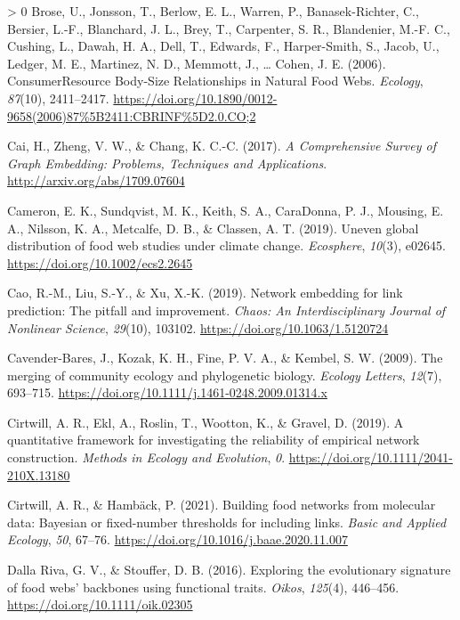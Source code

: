 \documentclass[11pt]{article}
\newlength{\cslhangindent}
\newenvironment{CSLReferences}[3] %
 {%
  \setlength{\parindent}{0pt}
  \ifodd #1 \everypar{\setlength{\hangindent}{\cslhangindent}}\ignorespaces\fi
  \ifnum #2 > 0
  \setlength{\parskip}{#2\baselineskip}
  \fi
 }%
 {}
\begin{document}
\begin{CSLReferences}{1}{0}
\leavevmode\hypertarget{ref-Brose2006ConRes}{}%
Brose, U., Jonsson, T., Berlow, E. L., Warren, P., Banasek-Richter, C.,
Bersier, L.-F., Blanchard, J. L., Brey, T., Carpenter, S. R.,
Blandenier, M.-F. C., Cushing, L., Dawah, H. A., Dell, T., Edwards, F.,
Harper-Smith, S., Jacob, U., Ledger, M. E., Martinez, N. D., Memmott,
J., \ldots{} Cohen, J. E. (2006). ConsumerResource Body-Size
Relationships in Natural Food Webs. \emph{Ecology}, \emph{87}(10),
2411--2417.
\url{https://doi.org/10.1890/0012-9658(2006)87\%5B2411:CBRINF\%5D2.0.CO;2}

\leavevmode\hypertarget{ref-Cai2017ComSur}{}%
Cai, H., Zheng, V. W., \& Chang, K. C.-C. (2017). \emph{A Comprehensive
Survey of Graph Embedding: Problems, Techniques and Applications}.
\url{http://arxiv.org/abs/1709.07604}

\leavevmode\hypertarget{ref-Cameron2019UneGlo}{}%
Cameron, E. K., Sundqvist, M. K., Keith, S. A., CaraDonna, P. J.,
Mousing, E. A., Nilsson, K. A., Metcalfe, D. B., \& Classen, A. T.
(2019). Uneven global distribution of food web studies under climate
change. \emph{Ecosphere}, \emph{10}(3), e02645.
\url{https://doi.org/10.1002/ecs2.2645}

\leavevmode\hypertarget{ref-Cao2019NetEmb}{}%
Cao, R.-M., Liu, S.-Y., \& Xu, X.-K. (2019). Network embedding for link
prediction: The pitfall and improvement. \emph{Chaos: An
Interdisciplinary Journal of Nonlinear Science}, \emph{29}(10), 103102.
\url{https://doi.org/10.1063/1.5120724}

\leavevmode\hypertarget{ref-Cavender-Bares2009MerCom}{}%
Cavender-Bares, J., Kozak, K. H., Fine, P. V. A., \& Kembel, S. W.
(2009). The merging of community ecology and phylogenetic biology.
\emph{Ecology Letters}, \emph{12}(7), 693--715.
\url{https://doi.org/10.1111/j.1461-0248.2009.01314.x}

\leavevmode\hypertarget{ref-Cirtwill2019QuaFra}{}%
Cirtwill, A. R., Ekl, A., Roslin, T., Wootton, K., \& Gravel, D. (2019).
A quantitative framework for investigating the reliability of empirical
network construction. \emph{Methods in Ecology and Evolution}, \emph{0}.
\url{https://doi.org/10.1111/2041-210X.13180}

\leavevmode\hypertarget{ref-Cirtwill2021BuiFoo}{}%
Cirtwill, A. R., \& Hambäck, P. (2021). Building food networks from
molecular data: Bayesian or fixed-number thresholds for including links.
\emph{Basic and Applied Ecology}, \emph{50}, 67--76.
\url{https://doi.org/10.1016/j.baae.2020.11.007}

\leavevmode\hypertarget{ref-DallaRiva2016ExpEvo}{}%
Dalla Riva, G. V., \& Stouffer, D. B. (2016). Exploring the evolutionary
signature of food webs' backbones using functional traits. \emph{Oikos},
\emph{125}(4), 446--456. \url{https://doi.org/10.1111/oik.02305}


\end{CSLReferences}
\end{document}
